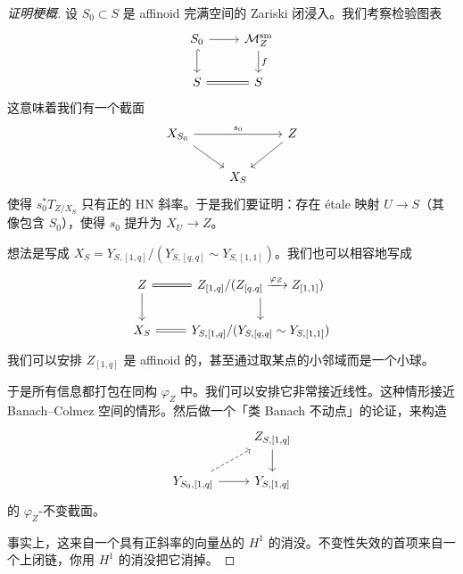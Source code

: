 \begin{proof}[证明梗概]
设 $S_0\subset S$ 是 affinoid 完满空间的 Zariski 闭浸入。我们考察检验图表
\[
\begin{tikzcd}
S_0 \arrow[r] \arrow[d, hook] & \mathcal{M}^{\mathrm{sm}}_Z \arrow[d, "f"] \\
S \arrow[r, equal] & S
\end{tikzcd}
\]
这意味着我们有一个截面
\[
\begin{tikzcd}
X_{S_0} \arrow[rr, "s_0"] \arrow[dr] & & Z \arrow[dl] \\
& X_S &
\end{tikzcd}
\]
使得 $s_0^*T_{Z/X_S}$ 只有正的 HN 斜率。于是我们要证明：存在 étale 映射 $U\to S$（其像包含 $S_0$），使得 $s_0$ 提升为 $X_U\to Z$。

想法是写成 $X_S=Y_{S,[1,q]}/(Y_{S,[q,q]}\sim Y_{S,[1,1]})$。我们也可以相容地写成
\[
\begin{tikzcd}
Z \arrow[r, equal] \arrow[d] & Z_{[1,q]}/(Z_{[q,q]}\xrightarrow{\varphi_Z}Z_{[1,1]}) \arrow[d] \\
X_S \arrow[r, equal] & Y_{S,[1,q]}/(Y_{S,[q,q]}\sim Y_{S,[1,1]})
\end{tikzcd}
\]
我们可以安排 $Z_{[1,q]}$ 是 affinoid 的，甚至通过取某点的小邻域而是一个小球。

于是所有信息都打包在同构 $\varphi_Z$ 中。我们可以安排它非常接近线性。这种情形接近 Banach--Colmez 空间的情形。然后做一个「类 Banach 不动点」的论证，来构造
\[
\begin{tikzcd}
& Z_{S,[1,q]} \arrow[d] \\
Y_{S_0,[1,q]} \arrow[ur, dashed] \arrow[r] & Y_{S,[1,q]}
\end{tikzcd}
\]
的 $\varphi_Z$-不变截面。

事实上，这来自一个具有正斜率的向量丛的 $H^1$ 的消没。不变性失效的首项来自一个上闭链，你用 $H^1$ 的消没把它消掉。
\end{proof}
